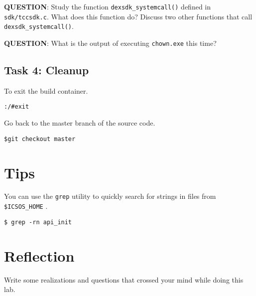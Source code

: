 \documentclass[a4paper, 11pt,oneside]{article}
\begin{document}
\textbf{QUESTION}: Study the function \texttt{dexsdk\_systemcall()} defined in 
\texttt{sdk/tccsdk.c}. What does this function do? Discuss two other functions 
that call \texttt{dexsdk\_systemcall()}. \newline 

\textbf{QUESTION}: What is the output of executing \texttt{chown.exe} this time?


\subsection*{Task 4: Cleanup}
To exit the build container. 
\begin{verbatim}
:/#exit
\end{verbatim}

Go back to the master branch of the source code.
\begin{verbatim}
$git checkout master
\end{verbatim}



\section{Tips}
You can use the \texttt{grep} utility to quickly search for strings in files from \texttt{\$ICSOS\_HOME} .
\begin{verbatim}
$ grep -rn api_init
\end{verbatim}
 
\section{Reflection}
Write some realizations and questions that crossed your mind while doing this 
lab. 
\end{document}
